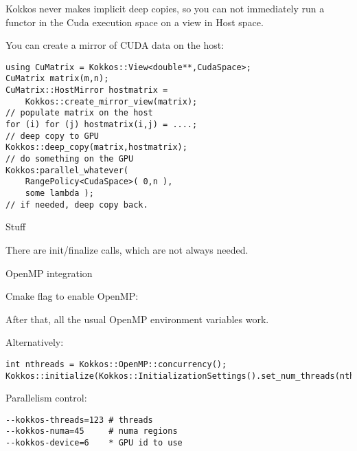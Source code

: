 Kokkos never makes implicit deep copies,
so you can not immediately run a functor in the Cuda execution space
on a view in Host space.

You can create a mirror of CUDA data on the host:
\begin{lstlisting}using CuMatrix = Kokkos::View<double**,CudaSpace>;
CuMatrix matrix(m,n);
CuMatrix::HostMirror hostmatrix =
    Kokkos::create_mirror_view(matrix);
// populate matrix on the host
for (i) for (j) hostmatrix(i,j) = ....;
// deep copy to GPU
Kokkos::deep_copy(matrix,hostmatrix);
// do something on the GPU
Kokkos:parallel_whatever(
    RangePolicy<CudaSpace>( 0,n ),
    some lambda );
// if needed, deep copy back.
\end{lstlisting}

 {Stuff}

There are init/finalize calls, which are not always needed.

 {OpenMP integration}

Cmake flag to enable OpenMP: 

After that, all the usual OpenMP environment variables work.

Alternatively:
\begin{lstlisting}
int nthreads = Kokkos::OpenMP::concurrency();
Kokkos::initialize(Kokkos::InitializationSettings().set_num_threads(nthreads))
\end{lstlisting}


Parallelism control:
\begin{verbatim}
--kokkos-threads=123 # threads
--kokkos-numa=45     # numa regions
--kokkos-device=6    * GPU id to use
\end{verbatim}

